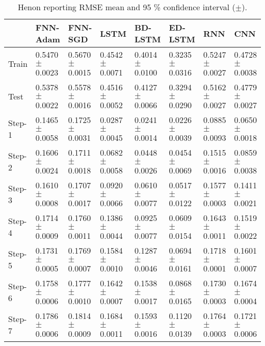 \documentclass{ieeeaccess}
\begin{document}
\begin{table*}[htbp]
 \smaller 
 \caption{Henon reporting RMSE mean and 95 \% confidence interval   ($\pm$).}
\label{tab:henon}
\begin{tabular}{llllllll}
\hline
 &  FNN-Adam& FNN-SGD & LSTM & BD-LSTM  & ED-LSTM & RNN & CNN\\
\hline
\hline
		
Train &  0.5470 $\pm$  0.0023 & 0.5670 $\pm$   0.0015  & 0.4542 $\pm$   0.0071  &  0.4014 $\pm$  0.0100 &  0.3235 $\pm$  0.0316  &  0.5247 $\pm$  0.0027 & 0.4728$\pm$ 	0.0038\\

Test &  0.5378 $\pm$  0.0022 & 0.5578 $\pm$  0.0016  & 0.4516 $\pm$  0.0052  &  0.4127 $\pm$ 0.0066 &  0.3294 $\pm$  0.0290  &  0.5162 $\pm$  0.0027&  	0.4779$\pm$ 	0.0027 \\

Step-1 &  0.1465 $\pm$  0.0058 & 0.1725 $\pm$   0.0031  & 0.0287 $\pm$   0.0045  & 0.0241 $\pm$  0.0014 &  0.0226 $\pm$  0.0039  & 0.0885 $\pm$  0.0093& 	0.0650$\pm$ 	0.0018  \\

Step-2 &  0.1606 $\pm$  0.0024 & 0.1711 $\pm$   0.0018  & 0.0682 $\pm$   0.0058  &  0.0448 $\pm$  0.0026 &  0.0454 $\pm$  0.0069  &  0.1515$\pm$ 0.0016 & 	0.0859	$\pm$ 0.0038 \\

Step-3 &  0.1610 $\pm$  0.0008 & 0.1707 $\pm$   0.0017  & 0.0920 $\pm$  0.0066  &  0.0610 $\pm$  0.0077 &  0.0517 $\pm$  0.0122  &  0.1577 $\pm$  0.0003&  	0.1411$\pm$ 	0.0021 \\

Step-4 &  0.1714 $\pm$  0.0009 & 0.1760 $\pm$   0.0011  & 0.1386 $\pm$  0.0044  &  0.0925 $\pm$  0.0077&  0.0609 $\pm$ 0.0154  &  0.1643 $\pm$  0.0011 & 	0.1519$\pm$ 	0.0022\\

Step-5 &  0.1731 $\pm$  0.0005 &0.1769 $\pm$   0.0007  &0.1584 $\pm$   0.0010  &  0.1287 $\pm$  0.0046 &  0.0694 $\pm$  0.0161  &  0.1718 $\pm$  0.0001 & 	0.1601$\pm$ 	0.0007 \\

Step-6 &  0.1758 $\pm$  0.0006 & 0.1777 $\pm$   0.0010  & 0.1642 $\pm$   0.0007  &  0.1538 $\pm$  0.0017 &  0.0868 $\pm$  0.0165  &  0.1730 $\pm$  0.0003 & 	0.1674$\pm$ 	0.0004 \\

Step-7 &  0.1786 $\pm$  0.0006 & 0.1814 $\pm$   0.0009  & 0.1684$\pm$  0.0011  &  0.1593 $\pm$  0.0016 &  0.1120 $\pm$  0.0139  &  0.1764 $\pm$  0.0003& 	0.1721$\pm$ 	0.0006  \\


\end{tabular}
\end{table*}
\end{document}
